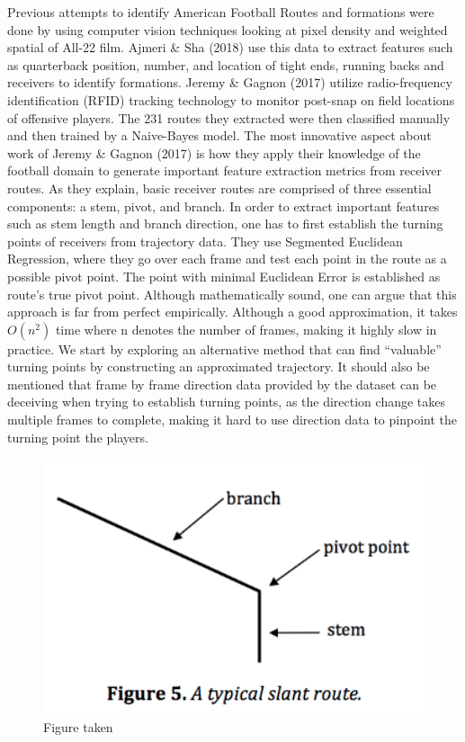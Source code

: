 \documentclass[12pt,oneside]{dukestatscithesis}
\theoremstyle{definition}
\theoremstyle{definition}
\theoremstyle{definition}
\theoremstyle{remark}
\begin{document}
Previous attempts to identify American Football Routes and formations
were done by using computer vision techniques looking at pixel density
and weighted spatial of All-22 film. Ajmeri \& Sha (2018) use this data
to extract features such as quarterback position, number, and location
of tight ends, running backs and receivers to identify formations.
Jeremy \& Gagnon (2017) utilize radio-frequency identification (RFID)
tracking technology to monitor post-snap on field locations of offensive
players. The 231 routes they extracted were then classified manually and
then trained by a Naive-Bayes model. The most innovative aspect about
work of Jeremy \& Gagnon (2017) is how they apply their knowledge of the
football domain to generate important feature extraction metrics from
receiver routes. As they explain, basic receiver routes are comprised of
three essential components: a stem, pivot, and branch. In order to
extract important features such as stem length and branch direction, one
has to first establish the turning points of receivers from trajectory
data. They use Segmented Euclidean Regression, where they go over each
frame and test each point in the route as a possible pivot point. The
point with minimal Euclidean Error is established as route's true pivot
point. Although mathematically sound, one can argue that this approach
is far from perfect empirically. Although a good approximation, it takes
\(O(n^{2})\) time where n denotes the number of frames, making it highly
slow in practice. We start by exploring an alternative method that can
find ``valuable'' turning points by constructing an approximated
trajectory. It should also be mentioned that frame by frame direction
data provided by the dataset can be deceiving when trying to establish
turning points, as the direction change takes multiple frames to
complete, making it hard to use direction data to pinpoint the turning
point the players.
\begin{figure}
\includegraphics[width=4.88in,angle=360, scale=1]{figure/routes} \caption{Figure taken}\label{fig:routepicture}
\end{figure}
\end{document}
